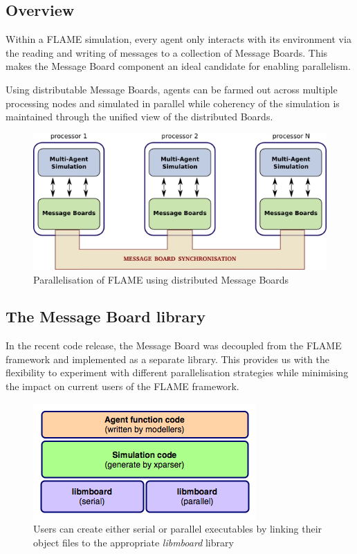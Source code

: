 \subsection{Overview}

Within a FLAME simulation, every agent only interacts with its environment via the reading and writing of messages to a collection of Message Boards. This makes the Message Board component an ideal candidate for enabling parallelism. 

Using distributable Message Boards, agents can be farmed out across multiple processing nodes and simulated in parallel while coherency of the simulation is maintained through the unified view of the distributed Boards.

\begin{figure}[h]
 \centering
  \includegraphics[scale=0.50]{mboard_flame.jpg}
 \caption{Parallelisation of FLAME using distributed Message Boards}
 \label{fig:mb_flame}
\end{figure}

\subsection{The Message Board library}
In the recent code release, the Message Board was decoupled from the FLAME framework and implemented as a separate library. This provides us with the flexibility to experiment with different parallelisation strategies while minimising the impact on current users of the FLAME framework.

\begin{figure}[h]
 \centering
  \includegraphics[scale=0.60]{mboard_overview.png}
 \caption{Users can create either serial or parallel executables by linking their object files to the appropriate \textit{libmboard} library}
 \label{fig:mb_overview}
\end{figure}

